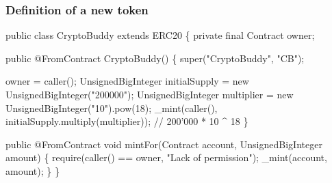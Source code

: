 \documentclass[11pt]{beamer}  %
\begin{document}
\begin{frame}[fragile]\frametitle{Definition of a new token}

{\scriptsize\begin{semiverbatim}
public class {\color{red}CryptoBuddy extends ERC20} \{
  private final Contract owner;

  public {\color{red}@FromContract} CryptoBuddy() \{
    super("CryptoBuddy", "CB");

    owner = caller();
    UnsignedBigInteger initialSupply = new UnsignedBigInteger("200000");
    UnsignedBigInteger multiplier = new UnsignedBigInteger("10").pow(18);
    _mint(caller(), initialSupply.multiply(multiplier)); // 200'000 * 10 ^ 18
  \}

  public @FromContract void mintFor(Contract account, UnsignedBigInteger amount) \{
    require(caller() == owner, {\color{armygreen}"Lack of permission"});
    _mint(account, amount);
  \}
\}
\end{semiverbatim}}

\end{frame}
\end{document}
